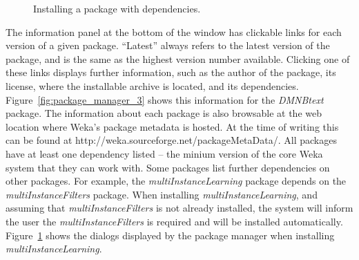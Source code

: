 \begin{figure}[!th]
\centering
{}
\qquad
{}
\caption{\label{fig:package_manager_4}Installing a package with dependencies.}
\end{figure}

The information panel at the bottom of the window has clickable links
for each version of a given package. ``Latest'' always refers to the
latest version of the package, and is the same as the highest version
number available. Clicking one of these links displays further
information, such as the author of the package, its license, where the
installable archive is located, and its
dependencies. Figure~\ref{fig:package_manager_3} shows this
information for the \textit{DMNBtext} package. The information about
each package is also browsable at the web location where Weka's
package metadata is hosted. At the time of writing this can be found
at http://weka.sourceforge.net/packageMetaData/. All packages have at
least one dependency listed – the minium version of the core Weka
system that they can work with. Some packages list further
dependencies on other packages. For example,
the \textit{multiInstanceLearning} package depends on the
\textit{multiInstanceFilters} package. When installing \textit{multiInstanceLearning},
and assuming that \textit{multiInstanceFilters} is not already
installed, the system will inform the user the \textit{multiInstanceFilters} is
required and will be installed automatically. Figure~\ref{fig:package_manager_4} shows the
dialogs displayed by the package manager when installing
\textit{multiInstanceLearning}.

